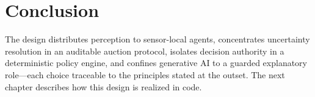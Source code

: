 \section{Conclusion}

The design distributes perception to sensor-local agents, concentrates uncertainty resolution in an auditable auction protocol, isolates decision authority in a deterministic policy engine, and confines generative AI to a guarded explanatory role---each choice traceable to the principles stated at the outset. The next chapter describes how this design is realized in code.
